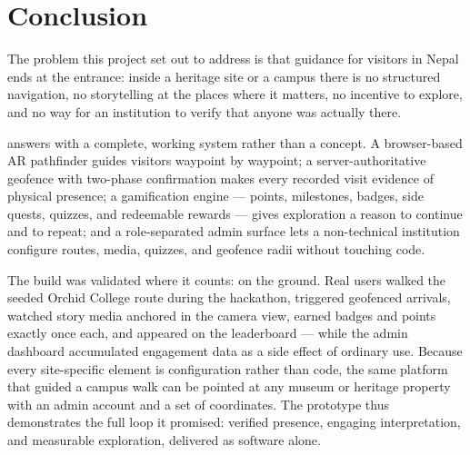 \chapter{Conclusion}
\label{ch:conclusion}

The problem this project set out to address is that guidance for visitors
in Nepal ends at the entrance: inside a heritage site or a campus there is
no structured navigation, no storytelling at the places where it matters,
no incentive to explore, and no way for an institution to verify that
anyone was actually there.

\projectname{} answers with a complete, working system rather than a
concept. A browser-based AR pathfinder guides visitors waypoint by
waypoint; a server-authoritative geofence with two-phase confirmation makes
every recorded visit evidence of physical presence; a gamification engine
--- points, milestones, badges, side quests, quizzes, and redeemable
rewards --- gives exploration a reason to continue and to repeat; and a
role-separated admin surface lets a non-technical institution configure
routes, media, quizzes, and geofence radii without touching code.

The build was validated where it counts: on the ground. Real users walked
the seeded Orchid College route during the hackathon, triggered geofenced
arrivals, watched story media anchored in the camera view, earned badges
and points exactly once each, and appeared on the leaderboard --- while the
admin dashboard accumulated engagement data as a side effect of ordinary
use. Because every site-specific element is configuration rather than
code, the same platform that guided a campus walk can be pointed at any
museum or heritage property with an admin account and a set of
coordinates. The prototype thus demonstrates the full loop it promised:
verified presence, engaging interpretation, and measurable exploration,
delivered as software alone.
